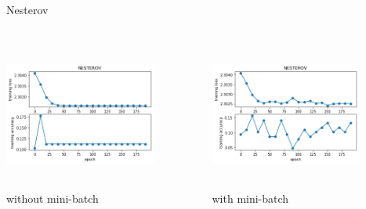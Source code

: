 \documentclass{beamer}
\begin{document}
\begin{frame}{Nesterov}
 \begin{columns}
    \begin{column}{0.47\textwidth}
          \includegraphics[width=5cm,height=5cm,angle=0]{nes_mini.png}\\
          \centering
          without mini-batch
    \end{column}
    \begin{column}{0.47\textwidth}
          \includegraphics[width=5cm,height=5cm,angle=0]{nes.png}\\
          \centering
          with mini-batch
    \end{column}
 \end{columns}
\end{frame}
\end{document}
